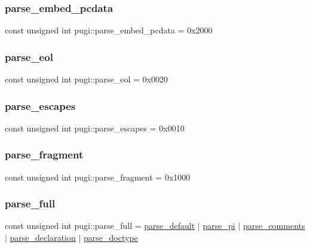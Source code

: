 \subsubsection{\texorpdfstring{parse\+\_\+embed\+\_\+pcdata}{parse\_embed\_pcdata}}
{\footnotesize\ttfamily const unsigned int pugi\+::parse\+\_\+embed\+\_\+pcdata = 0x2000}

\mbox{\label{namespacepugi_ad4e017365d2ff3ee04e226c35129b475}} 
\subsubsection{\texorpdfstring{parse\+\_\+eol}{parse\_eol}}
{\footnotesize\ttfamily const unsigned int pugi\+::parse\+\_\+eol = 0x0020}

\mbox{\label{namespacepugi_ab5ef8454110599611900ff48012c8ad6}} 
\subsubsection{\texorpdfstring{parse\+\_\+escapes}{parse\_escapes}}
{\footnotesize\ttfamily const unsigned int pugi\+::parse\+\_\+escapes = 0x0010}

\mbox{\label{namespacepugi_a79d7a2d2a9899d79abe6e06fdaa2134f}} 
\subsubsection{\texorpdfstring{parse\+\_\+fragment}{parse\_fragment}}
{\footnotesize\ttfamily const unsigned int pugi\+::parse\+\_\+fragment = 0x1000}

\mbox{\label{namespacepugi_a7d773377222d4cb6951297d61605c6a7}} 
\subsubsection{\texorpdfstring{parse\+\_\+full}{parse\_full}}
{\footnotesize\ttfamily const unsigned int pugi\+::parse\+\_\+full = \hyperlink{namespacepugi_ad7c927d1c1752330637c3318b0d7b366}{parse\+\_\+default} $\vert$ \hyperlink{namespacepugi_a8fb7ea408d60b4f2ca79dd30b651f545}{parse\+\_\+pi} $\vert$ \hyperlink{namespacepugi_adcab316176bfaf69158339962fb4ad38}{parse\+\_\+comments} $\vert$ \hyperlink{namespacepugi_adb5db03ce720dcd90e900b9bb7e70427}{parse\+\_\+declaration} $\vert$ \hyperlink{namespacepugi_afa993ffcd3e228d21f48071e7c097f32}{parse\+\_\+doctype}}

